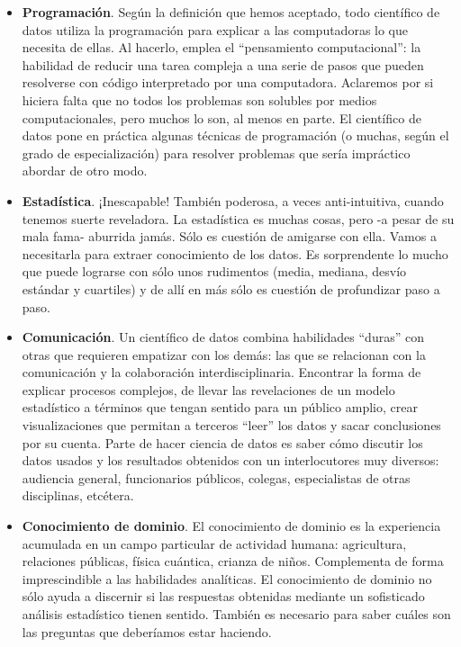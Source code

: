 \documentclass[
]{book}
\begin{document}
\begin{itemize}
\item
  \textbf{Programación}. Según la definición que hemos aceptado, todo científico de datos utiliza la programación para explicar a las computadoras lo que necesita de ellas. Al hacerlo, emplea el ``pensamiento computacional'': la habilidad de reducir una tarea compleja a una serie de pasos que pueden resolverse con código interpretado por una computadora. Aclaremos por si hiciera falta que no todos los problemas son solubles por medios computacionales, pero muchos lo son, al menos en parte. El científico de datos pone en práctica algunas técnicas de programación (o muchas, según el grado de especialización) para resolver problemas que sería impráctico abordar de otro modo.
\item
  \textbf{Estadística}. ¡Inescapable! También poderosa, a veces anti-intuitiva, cuando tenemos suerte reveladora. La estadística es muchas cosas, pero -a pesar de su mala fama- aburrida jamás. Sólo es cuestión de amigarse con ella. Vamos a necesitarla para extraer conocimiento de los datos. Es sorprendente lo mucho que puede lograrse con sólo unos rudimentos (media, mediana, desvío estándar y cuartiles) y de allí en más sólo es cuestión de profundizar paso a paso.
\item
  \textbf{Comunicación}. Un científico de datos combina habilidades ``duras'' con otras que requieren empatizar con los demás: las que se relacionan con la comunicación y la colaboración interdisciplinaria. Encontrar la forma de explicar procesos complejos, de llevar las revelaciones de un modelo estadístico a términos que tengan sentido para un público amplio, crear visualizaciones que permitan a terceros ``leer'' los datos y sacar conclusiones por su cuenta. Parte de hacer ciencia de datos es saber cómo discutir los datos usados y los resultados obtenidos con un interlocutores muy diversos: audiencia general, funcionarios públicos, colegas, especialistas de otras disciplinas, etcétera.
\item
  \textbf{Conocimiento de dominio}. El conocimiento de dominio es la experiencia acumulada en un campo particular de actividad humana: agricultura, relaciones públicas, física cuántica, crianza de niños. Complementa de forma imprescindible a las habilidades analíticas. El conocimiento de dominio no sólo ayuda a discernir si las respuestas obtenidas mediante un sofisticado análisis estadístico tienen sentido. También es necesario para saber cuáles son las preguntas que deberíamos estar haciendo.
\end{itemize}
\end{document}
